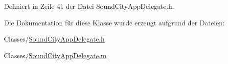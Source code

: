 Definiert in Zeile 41 der Datei SoundCityAppDelegate.h.

Die Dokumentation für diese Klasse wurde erzeugt aufgrund der Dateien:\begin{DoxyCompactItemize}
\item 
Classes/\hyperlink{_sound_city_app_delegate_8h}{SoundCityAppDelegate.h}\item 
Classes/\hyperlink{_sound_city_app_delegate_8m}{SoundCityAppDelegate.m}\end{DoxyCompactItemize}
